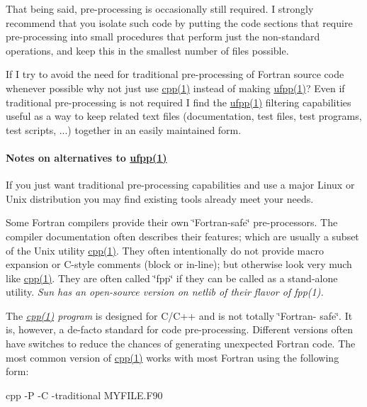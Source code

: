 That being said, pre-\/processing is occasionally still required. I strongly recommend that you isolate such code by putting the code sections that require pre-\/processing into small procedures that perform just the non-\/standard operations, and keep this in the smallest number of files possible. 

If I try to avoid the need for traditional pre-\/processing of Fortran source code whenever possible why not just use \hyperlink{ufpp__overview_81_8txt_ad80405d1dd53db5cd0aa7a8cc7e457a3}{cpp(1)} instead of making \hyperlink{ufpp__overview_81_8txt_a97c20a96bcab81bc74c9d64b001f1202}{ufpp(1)}? Even if traditional pre-\/processing is not required I find the \hyperlink{ufpp__overview_81_8txt_a97c20a96bcab81bc74c9d64b001f1202}{ufpp(1)} filtering capabilities useful as a way to keep related text files (documentation, test files, test programs, test scripts, ...) together in an easily maintained form. 

\paragraph*{Notes on alternatives to \hyperlink{ufpp__overview_81_8txt_a97c20a96bcab81bc74c9d64b001f1202}{ufpp(1)}}

If you just want traditional pre-\/processing capabilities and use a major Linux or Unix distribution you may find existing tools already meet your needs. 

Some Fortran compilers provide their own \char`\"{}\+Fortran-\/safe\char`\"{} pre-\/processors. The compiler documentation often describes their features; which are usually a subset of the Unix utility \hyperlink{ufpp__overview_81_8txt_ad80405d1dd53db5cd0aa7a8cc7e457a3}{cpp(1)}. They often intentionally do not provide macro expansion or C-\/style comments (block or in-\/line); but otherwise look very much like \hyperlink{ufpp__overview_81_8txt_ad80405d1dd53db5cd0aa7a8cc7e457a3}{cpp(1)}. They are often called \char`\"{}fpp\char`\"{} if they can be called as a stand-\/alone utility. {\itshape  Sun has an open-\/source version on netlib of their flavor of fpp(1). } 

The {\itshape \hyperlink{ufpp__overview_81_8txt_ad80405d1dd53db5cd0aa7a8cc7e457a3}{cpp(1)} program} is designed for C/\+C++ and is not totally \char`\"{}\+Fortran-\/
    safe\char`\"{}. It is, however, a de-\/facto standard for code pre-\/processing. Different versions often have switches to reduce the chances of generating unexpected Fortran code. The most common version of \hyperlink{ufpp__overview_81_8txt_ad80405d1dd53db5cd0aa7a8cc7e457a3}{cpp(1)} works with most Fortran using the following form\+: 
\begin{DoxyPre}
    cpp -P -C -traditional MYFILE.F90
    \end{DoxyPre}
 


